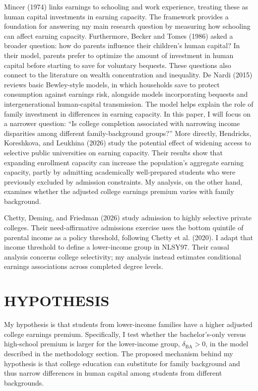 \documentclass[12pt,letterpaper]{article}
\begin{document}
Mincer (1974) links earnings to schooling and work experience, treating these as human
capital investments in earning capacity. The framework provides a foundation for answering
my main research question by measuring how schooling can affect earning capacity.
Furthermore, Becker and Tomes (1986) asked a broader question: how do parents influence
their children’s human capital? In their model, parents prefer to optimize the amount of
investment in human capital before starting to save for voluntary bequests.
These questions also connect to the literature on wealth concentration and inequality. De
Nardi (2015) reviews basic Bewley-style models, in which households save to protect
consumption against earnings risk, alongside models incorporating bequests and
intergenerational human-capital transmission. The model helps explain the role of family investment in
differences in earning capacity. In this paper, I will focus on a narrower question: “Is college
completion associated with narrowing income disparities among different family-background
groups?”
More directly, Hendricks, Koreshkova, and Leukhina (2026) study the potential effect of
widening access to selective public universities on earning capacity. Their results show that
expanding enrollment capacity can increase the population’s aggregate earning capacity,
partly by admitting academically well-prepared students who were previously excluded by
admission constraints. My analysis, on the other hand, examines whether the adjusted
college earnings premium varies with family background.

Chetty, Deming, and Friedman (2026) study admission to highly selective private
colleges. Their need-affirmative admissions exercise uses the bottom quintile of
parental income as a policy threshold, following Chetty et al. (2020). I adapt
that income threshold to define a lower-income group in NLSY97. Their causal
analysis concerns college selectivity; my analysis instead estimates conditional
earnings associations across completed degree levels.

\section*{HYPOTHESIS}
My hypothesis is that students from lower-income families have a higher adjusted college
earnings premium. Specifically, I test whether the bachelor's-only versus high-school
premium is larger for the lower-income group, $\delta_{\mathrm{BA}}>0$, in the model
described in the methodology section.
The proposed mechanism behind my hypothesis is that college education can substitute
for family background and thus narrow differences in human capital among students from
different backgrounds.
\end{document}
